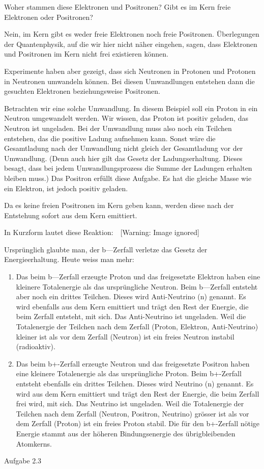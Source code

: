 \documentclass[12pt,a4paper,twoside]{article}
\begin{document}
Woher stammen diese Elektronen und Positronen? Gibt es im Kern freie Elektronen oder Positronen?

Nein, im Kern gibt es weder freie Elektronen noch freie Positronen. Überlegungen der Quantenphysik, auf die wir hier nicht näher eingehen, sagen, dass Elektronen und Positronen im Kern nicht frei existieren können.

Experimente haben aber gezeigt, dass sich Neutronen in Protonen und Protonen in Neutronen umwandeln können. Bei diesen Umwandlungen entstehen dann die gesuchten Elektronen beziehungsweise Positronen.

Betrachten wir eine solche Umwandlung. In diesem Beispiel soll ein Proton in ein Neutron umgewandelt werden. Wir wissen, das Proton ist positiv geladen, das Neutron ist ungeladen. Bei der Umwandlung muss also noch ein Teilchen entstehen, das die positive Ladung aufnehmen kann. Sonst wäre die Gesamtladung nach der Umwandlung nicht gleich der Gesamtladung vor der Umwandlung. (Denn auch hier gilt das Gesetz der Ladungserhaltung. Dieses besagt, dass bei jedem Umwandlungsprozess die Summe der Ladungen erhalten bleiben muss.) Das Positron erfüllt diese Aufgabe. Es hat die gleiche Masse wie ein Elektron, ist jedoch positiv geladen.

Da es keine freien Positronen im Kern geben kann, werden diese nach der Entstehung sofort aus dem Kern emittiert.

In Kurzform lautet diese Reaktion:\ \   [Warning: Image ignored] %
 

Ursprünglich glaubte man, der \textgreek{b}{}---Zerfall verletze das Gesetz der Energieerhaltung. Heute weiss man mehr:

\begin{enumerate}
\item Das beim \textgreek{b}{}---Zerfall erzeugte Proton und das freigesetzte Elektron haben eine kleinere Totalenergie als das ursprüngliche Neutron. Beim \textgreek{b}{}---Zerfall entsteht aber noch ein drittes Teilchen. Dieses wird Anti-Neutrino (\textgreek{n) }genannt. Es wird ebenfalls aus dem Kern emittiert und trägt den Rest der Energie, die beim Zerfall entsteht, mit sich. Das Anti-Neutrino ist ungeladen. Weil die Totalenergie der Teilchen nach dem Zerfall (Proton, Elektron, Anti-Neutrino) kleiner ist als vor dem Zerfall (Neutron) ist ein freies Neutron instabil (radioaktiv).
\item Das beim \textgreek{b}+\nobreakdash-Zerfall erzeugte Neutron und das freigesetzte Positron haben eine kleinere Totalenergie als das ursprüngliche Proton. Beim \textgreek{b}+\nobreakdash-Zerfall entsteht ebenfalls ein drittes Teilchen. Dieses wird Neutrino (\textgreek{n) }genannt. Es wird aus dem Kern emittiert und trägt den Rest der Energie, die beim Zerfall frei wird, mit sich. Das Neutrino ist ungeladen. Weil die Totalenergie der Teilchen nach dem Zerfall (Neutron, Positron, Neutrino) grösser ist als vor dem Zerfall (Proton) ist ein freies Proton stabil. Die für den \textgreek{b}+\nobreakdash-Zerfall nötige Energie stammt aus der höheren Bindungsenergie des übrigbleibenden Atomkerns.
\end{enumerate}
Aufgabe 2.3
\end{document}
